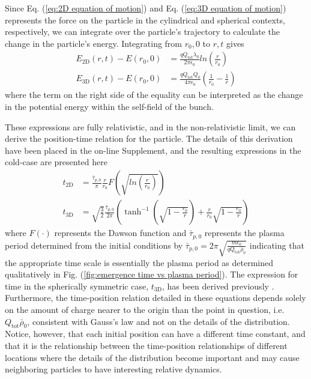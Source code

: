 \documentclass[aps,prl,twocolumn,showpacs,superscriptaddress,groupedaddress]{revtex4-1}  %
\begin{document}
{ Since Eq. (\ref{eq:2D equation of motion}) and Eq. (\ref{eq:3D equation of motion}) 
 represents the force on the particle in the cylindrical and spherical contexts, respectively, 
 we can integrate over the particle's 
 trajectory to calculate the change in the particle's energy. 
 Integrating from $r_0, 0$ to $r, t$ gives
\begin{align}
  E_\text{2D}(r,t) - E(r_0,0) &= \frac{q Q_\text{tot} \lambda_0}{2 \pi \epsilon_0} ln\left(\frac{r}{r_0}\right)\label{eq:2D energy}\\
  E_\text{3D}(r,t) - E(r_0,0) &= \frac{q Q_\text{tot} Q_0}{4 \pi \epsilon_0} \left(\frac{1}{r_0} - \frac{1}{r}\right)\label{eq:3D energy}
\end{align}
where the term on the right side of the equality can be interpreted as  the change in the potential energy within the self-field
of the bunch.  

These expressions are fully relativistic, and in the non-relativistic limit, we can derive the position-time relation for the particle.
The details of this derivation have been placed in the on-line Supplement, and the resulting expressions in the cold-case are presented here
\begin{align}
  t_\text{2D} &= \frac{\bar{\tau}_{p,0}}{\pi} \frac{r}{r_0} F\left(\sqrt{ln\left(\frac{r}{r_0}\right)}\right)\label{eq:2D time}\\
  t_\text{3D} &= \sqrt{\frac{3}{2}}\frac{\bar{\tau}_{p,0}}{2\pi} \left( \tanh^{-1} \left( \sqrt{1 -  \frac{r_0}{r}} \right) + \frac{r}{r_0}\sqrt{1 -  \frac{r_0}{r}}\right)\label{eq:3D time}
\end{align}
where $F(\cdot)$ represents the Dawson function and $\bar{\tau}_{p,0}$ represents the plasma period 
determined from the initial conditions
by $\bar{\tau}_{p,0} = 2\pi \sqrt{\frac{m\epsilon_0}{q Q_\text{tot} \bar{\rho}_0}}$ indicating that the
appropriate time scale is essentially the plasma period as determined qualitatively in Fig. (\ref{fig:emergence time vs plasma period}).
The expression for time in the spherically symmetric case, $t_\text{3D}$, has been derived previously \cite{Last:1997_analytic_coulomb_explosion}.
Furthermore, the time-position relation detailed in these equations depends solely on the amount of charge 
nearer to the origin than the point in question, i.e. $Q_\text{tot} \bar{\rho}_0$, consistent with 
Gauss's law and not on the details of the distribution.  Notice, however,
that each initial position can have a different time constant, and that it is the relationship between the 
time-position relationships of different locations where the details of the distribution become important and may cause
neighboring particles to have interesting relative dynamics.  

}
\end{document}

